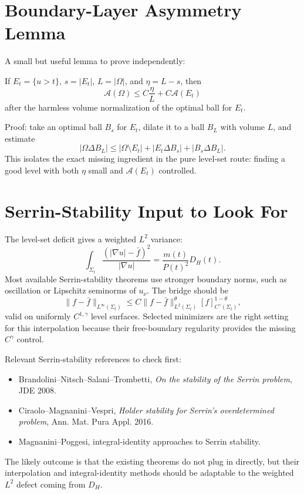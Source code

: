 \documentclass[11pt]{article}
\begin{document}
\section{Boundary-Layer Asymmetry Lemma}

A small but useful lemma to prove independently:

If \(E_t=\{u>t\}\), \(s=|E_t|\), \(L=|\Omega|\), and \(\eta=L-s\), then
\[
\mathcal A(\Omega)
\le
C\frac{\eta}{L}
+C\mathcal A(E_t)
\]
after the harmless volume normalization of the optimal ball for \(E_t\).

Proof: take an optimal ball \(B_s\) for \(E_t\), dilate it to a ball \(B_L\)
with volume \(L\), and estimate
\[
|\Omega\Delta B_L|
\le
|\Omega\setminus E_t|
+|E_t\Delta B_s|
+|B_s\Delta B_L|.
\]
This isolates the exact missing ingredient in the pure level-set route:
finding a good level with both \(\eta\) small and \(\mathcal A(E_t)\) controlled.

\section{Serrin-Stability Input to Look For}

The level-set deficit gives a weighted \(L^2\) variance:
\[
\int_{\Sigma_t}\frac{(|\nabla u|-\bar f)^2}{|\nabla u|}
=
\frac{m(t)}{P(t)^2}D_H(t).
\]
Most available Serrin-stability theorems use stronger boundary norms, such as
oscillation or Lipschitz seminorms of \(u_\nu\). The bridge should be
\[
\|f-\bar f\|_{L^\infty(\Sigma_t)}
\le
C
\|f-\bar f\|_{L^2(\Sigma_t)}^\theta
[f]_{C^\gamma(\Sigma_t)}^{1-\theta},
\]
valid on uniformly \(C^{1,\gamma}\) level surfaces. Selected minimizers are the
right setting for this interpolation because their free-boundary regularity
provides the missing \(C^\gamma\) control.

Relevant Serrin-stability references to check first:
\begin{itemize}
\item Brandolini--Nitsch--Salani--Trombetti, \emph{On the stability of the
Serrin problem}, JDE 2008.
\item Ciraolo--Magnanini--Vespri, \emph{Holder stability for Serrin's
overdetermined problem}, Ann. Mat. Pura Appl. 2016.
\item Magnanini--Poggesi, integral-identity approaches to Serrin stability.
\end{itemize}
The likely outcome is that the existing theorems do not plug in directly, but
their interpolation and integral-identity methods should be adaptable to the
weighted \(L^2\) defect coming from \(D_H\).
\end{document}
